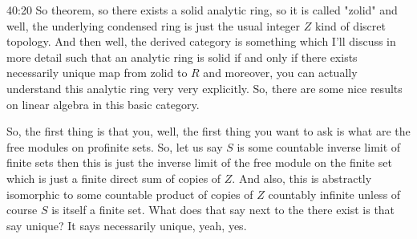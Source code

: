 \begin{unfinished}{40:20}
So theorem, so there exists a solid analytic ring, so it is called "zolid" and well, the underlying condensed ring is just the usual integer $Z$ kind of discret topology. And then well, the derived category is something which I'll discuss in more detail such that an analytic ring is solid if and only if there exists necessarily unique map from zolid to $R$ and moreover, you can actually understand this analytic ring very very explicitly. So, there are some nice results on linear algebra in this basic category.

So, the first thing is that you, well, the first thing you want to ask is what are the free modules on profinite sets. So, let us say $S$ is some countable inverse limit of finite sets then this is just the inverse limit of the free module on the finite set which is just a finite direct sum of copies of $Z$. And also, this is abstractly isomorphic to some countable product of copies of $Z$ countably infinite unless of course $S$ is itself a finite set. What does that say next to the there exist is that say unique? It says necessarily unique, yeah, yes. 


\end{unfinished}
